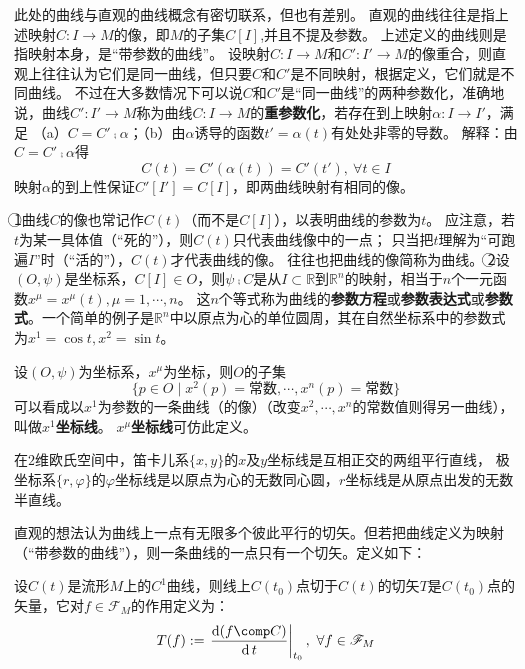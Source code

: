 \begin{note}
此处的曲线与直观的曲线概念有密切联系，但也有差别。
直观的曲线往往是指上述映射$C \colon I \to M$的像，即$M$的子集$C[I]$,并且不提及参数。
上述定义的曲线则是指映射本身，是``带参数的曲线''。
设映射$C \colon I \to M$和$C' \colon I' \to M$的像重合，则直观上往往认为它们是同一曲线，但只要$C$和$C'$是不同映射，根据定义，它们就是不同曲线。
不过在大多数情况下可以说$C$和$C'$是``同一曲线''的两种参数化，准确地说，曲线$C' \colon I' \to M$称为曲线$C \colon I \to M$的\textbf{重参数化}，若存在到上映射$\alpha \colon I \to I'$，满足
（a）$C = C' \comp \alpha$；（b）由$\alpha$诱导的函数$t' = \alpha(t)$有处处非零的导数。
解释：由$C = C' \comp \alpha$得$$C(t) = C'(\alpha(t)) = C'(t'), ~ \forall t \in I$$
映射$\alpha$的到上性保证$C'[I'] = C[I]$，即两曲线映射有相同的像。
\end{note}

\begin{note}
\textcircled{1}曲线$C$的像也常记作$C(t)$（而不是$C[I]$），以表明曲线的参数为$t$。
应注意，若$t$为某一具体值（``死的''），则$C(t)$只代表曲线像中的一点；
只当把$t$理解为``可跑遍$I$''时（``活的''），$C(t)$才代表曲线的像。
往往也把曲线的像简称为曲线。
\textcircled{2}设$(O, \psi)$是坐标系，$C[I] \in O$，则$\psi \comp C$是从$I \subset \mathbb{R}$到$\mathbb{R}^n$的映射，相当于$n$个一元函数$x^\mu = x^\mu(t), \mu = 1, \cdots, n$。
这$n$个等式称为曲线的\textbf{参数方程}或\textbf{参数表达式}或\textbf{参数式}。一个简单的例子是$\mathbb{R}^n$中以原点为心的单位圆周，其在自然坐标系中的参数式为$x^1 = \cos t, x^2 = \sin t$。
\end{note}

\begin{definition}
设$(O, \psi)$为坐标系，$x^\mu$为坐标，则$O$的子集
$$\{p \in O \mid x^2(p) = \text{常数}, \cdots, x^n(p) = \text{常数}\}$$
可以看成以$x^1$为参数的一条曲线（的像）（改变$x^2, \cdots, x^n$的常数值则得另一曲线），叫做\textbf{$x^1$坐标线}。
\textbf{$x^\mu$坐标线}可仿此定义。
\end{definition}

\begin{example}
在$2$维欧氏空间中，笛卡儿系$\{x, y\}$的$x$及$y$坐标线是互相正交的两组平行直线，
极坐标系$\{r, \varphi\}$的$\varphi$坐标线是以原点为心的无数同心圆，$r$坐标线是从原点出发的无数半直线。
\end{example}

直观的想法认为曲线上一点有无限多个彼此平行的切矢。但若把曲线定义为映射（``带参数的曲线''），则一条曲线的一点只有一个切矢。定义如下：

\begin{definition}
设$C(t)$是流形$M$上的$C^1$曲线，则线上$C(t_0)$点切于$C(t)$的切矢$T$是$C(t_0)$点的矢量，它对$f \in \mathscr{F}_M$的作用定义为：
$$T(f) := \left.\frac{\diff (f \comp C)}{\diff t}\right|_{t_0}, ~ \forall f \in \mathscr{F}_M$$
\end{definition}

